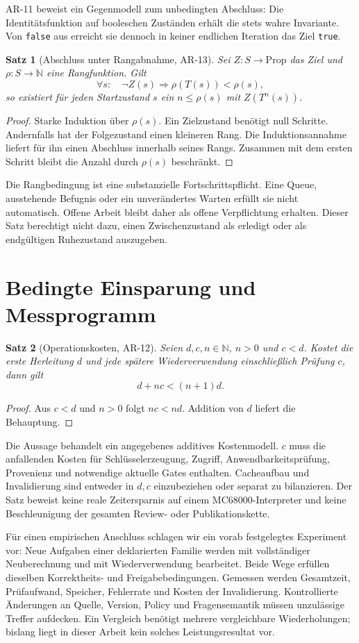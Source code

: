 \documentclass[11pt,a4paper]{article}
\newtheorem{satz}{Satz}
\newcommand{\AR}[1]{\textsf{AR-#1}}
\newcommand{\N}{\mathbb N}
\begin{document}
\AR{11} beweist ein Gegenmodell zum unbedingten Abschluss: Die Identitätsfunktion
auf booleschen Zuständen erhält die stets wahre Invariante. Von \texttt{false}
aus erreicht sie dennoch in keiner endlichen Iteration das Ziel \texttt{true}.

\begin{satz}[Abschluss unter Rangabnahme, \AR{13}]
Sei $Z:S\to\mathrm{Prop}$ das Ziel und $\rho:S\to\N$ eine Rangfunktion. Gilt
\[
 \forall s:\quad\neg Z(s)\Longrightarrow\rho(T(s))<\rho(s),
\]
so existiert für jeden Startzustand $s$ ein $n\leq\rho(s)$ mit $Z(T^n(s))$.
\end{satz}
\begin{proof}
Starke Induktion über $\rho(s)$. Ein Zielzustand benötigt null Schritte.
Andernfalls hat der Folgezustand einen kleineren Rang. Die Induktionsannahme
liefert für ihn einen Abschluss innerhalb seines Rangs. Zusammen mit dem ersten
Schritt bleibt die Anzahl durch $\rho(s)$ beschränkt.
\end{proof}
Die Rangbedingung ist eine substanzielle Fortschrittspflicht. Eine Queue,
ausstehende Befugnis oder ein unverändertes Warten erfüllt sie nicht automatisch.
Offene Arbeit bleibt daher als offene Verpflichtung erhalten. Dieser Satz
berechtigt nicht dazu, einen Zwischenzustand als erledigt oder als endgültigen
Ruhezustand auszugeben.

\section{Bedingte Einsparung und Messprogramm}
\begin{satz}[Operationskosten, \AR{12}]
Seien $d,c,n\in\N$, $n>0$ und $c<d$. Kostet die erste Herleitung $d$ und jede
spätere Wiederverwendung einschließlich Prüfung $c$, dann gilt
\[
 d+n c < (n+1)d.
\]
\end{satz}
\begin{proof}
Aus $c<d$ und $n>0$ folgt $nc<nd$. Addition von $d$ liefert die Behauptung.
\end{proof}
Die Aussage behandelt ein angegebenes additives Kostenmodell. $c$ muss die
anfallenden Kosten für Schlüsselerzeugung, Zugriff, Anwendbarkeitsprüfung,
Provenienz und notwendige aktuelle Gates enthalten. Cacheaufbau und Invalidierung
sind entweder in $d,c$ einzubeziehen oder separat zu bilanzieren. Der Satz
beweist keine reale Zeitersparnis auf einem MC68000-Interpreter und keine
Beschleunigung der gesamten Review- oder Publikationskette.

Für einen empirischen Anschluss schlagen wir ein vorab festgelegtes Experiment
vor: Neue Aufgaben einer deklarierten Familie werden mit vollständiger
Neuberechnung und mit Wiederverwendung bearbeitet. Beide Wege erfüllen dieselben
Korrektheits- und Freigabebedingungen. Gemessen werden Gesamtzeit,
Prüfaufwand, Speicher, Fehlerrate und Kosten der Invalidierung. Kontrollierte
Änderungen an Quelle, Version, Policy und Fragensemantik müssen unzulässige Treffer
aufdecken. Ein Vergleich benötigt mehrere vergleichbare Wiederholungen; bislang
liegt in dieser Arbeit kein solches Leistungsresultat vor.
\end{document}
